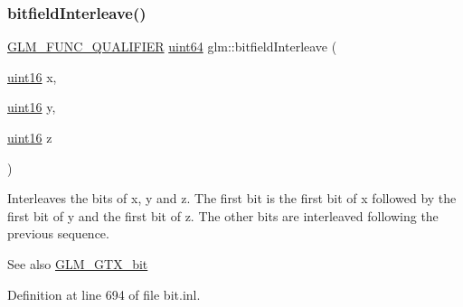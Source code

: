 \mbox{\label{group__gtx__bit_ga3c170e2ec54f2faab5e1c5bb693d718d}} 
\subsubsection{\texorpdfstring{bitfield\+Interleave()}{bitfieldInterleave()}\hspace{0.1cm}{\footnotesize\ttfamily [10/16]}}
{\footnotesize\ttfamily \hyperlink{setup_8hpp_a33fdea6f91c5f834105f7415e2a64407}{G\+L\+M\+\_\+\+F\+U\+N\+C\+\_\+\+Q\+U\+A\+L\+I\+F\+I\+ER} \hyperlink{group__gtc__type__precision_gae3632bf9b37da66233d78930dd06378a}{uint64} glm\+::bitfield\+Interleave (\begin{DoxyParamCaption}\item[{\hyperlink{group__gtc__type__precision_gad8c2939e1fdd8e5828b31d95c52255d5}{uint16}}]{x,  }\item[{\hyperlink{group__gtc__type__precision_gad8c2939e1fdd8e5828b31d95c52255d5}{uint16}}]{y,  }\item[{\hyperlink{group__gtc__type__precision_gad8c2939e1fdd8e5828b31d95c52255d5}{uint16}}]{z }\end{DoxyParamCaption})}

Interleaves the bits of x, y and z. The first bit is the first bit of x followed by the first bit of y and the first bit of z. The other bits are interleaved following the previous sequence.

\begin{DoxySeeAlso}{See also}
\hyperlink{group__gtx__bit}{G\+L\+M\+\_\+\+G\+T\+X\+\_\+bit} 
\end{DoxySeeAlso}


Definition at line 694 of file bit.\+inl.

\mbox{\label{group__gtx__bit_ga64e2d84f6560af3cc639644b1e628c42}} 
